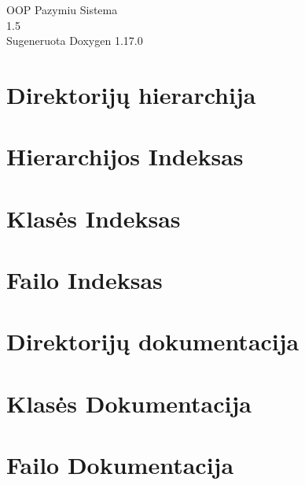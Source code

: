 \documentclass[twoside]{book}
\newcommand{\+}{\discretionary{\mbox{\scriptsize$\hookleftarrow$}}{}{}}
\newcommand{\clearemptydoublepage}{%
    \newpage{\pagestyle{empty}\cleardoublepage}%
  }
\begin{document}
  \raggedbottom
    \hypersetup{pageanchor=false,
                bookmarksnumbered=true,
                pdfencoding=unicode
               }
  \begin{titlepage}
  \vspace*{7cm}
  \begin{center}%
  {\Large OOP Pazymiu Sistema}\\
  [1ex]\large 1.\+5 \\
  \vspace*{1cm}
  {\large Sugeneruota Doxygen 1.17.0}\\
  \end{center}
  \end{titlepage}
  \clearemptydoublepage
  \tableofcontents
  \clearemptydoublepage
  \hypersetup{pageanchor=true}

\chapter{Direktorijų hierarchija}

\chapter{Hierarchijos Indeksas}

\chapter{Klasės Indeksas}

\chapter{Failo Indeksas}

\chapter{Direktorijų dokumentacija}


\chapter{Klasės Dokumentacija}


\chapter{Failo Dokumentacija}









  \backmatter
  \newpage
  \clearemptydoublepage
  \printindex
\end{document}

